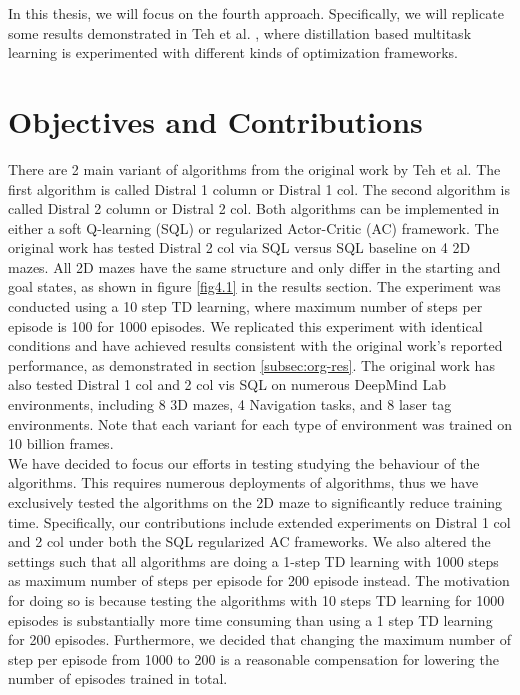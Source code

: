 \documentclass[12pt]{report}
\begin{document}
In this thesis, we will focus on the fourth approach. Specifically, we will replicate some results demonstrated in Teh et al. \cite{teh2017distral}, where distillation based multitask learning is experimented with different kinds of optimization frameworks. 

\section{Objectives and Contributions}
There are 2 main variant of algorithms from the original work by Teh et al. The first algorithm is called Distral 1 column or Distral 1 col. The second algorithm is called Distral 2 column or Distral 2 col. Both algorithms can be implemented in either a soft Q-learning (SQL) or regularized Actor-Critic (AC) framework. The original work has tested Distral 2 col via SQL versus SQL baseline on 4 2D mazes. All 2D mazes have the same structure and only differ in the starting and goal states, as shown in figure \ref{fig4.1} in the results section. The experiment was conducted using a 10 step TD learning, where maximum number of steps per episode is 100 for 1000 episodes. We replicated this experiment with identical conditions and have achieved results consistent with the original work's reported performance, as demonstrated in section \ref{subsec:org-res}. The original work has also tested Distral 1 col and 2 col vis SQL on numerous DeepMind Lab environments, including 8 3D mazes, 4 Navigation tasks, and 8 laser tag environments. Note that each variant for each type of environment was trained on 10 billion frames.\\

We have decided to focus our efforts in testing studying the behaviour of the algorithms. This requires numerous deployments of algorithms, thus we have exclusively tested the algorithms on the 2D maze to significantly reduce training time. Specifically, our contributions include extended experiments on Distral 1 col and 2 col under both the SQL regularized AC frameworks. We also altered the settings such that all algorithms are doing a 1-step TD learning with 1000 steps as maximum number of steps per episode for 200 episode instead. The motivation for doing so is because testing the algorithms with 10 steps TD learning for 1000 episodes is substantially more time consuming than using a 1 step TD learning for 200 episodes. Furthermore, we decided that changing the maximum number of step per episode from 1000 to 200 is a reasonable compensation for lowering the number of episodes trained in total.\\
\end{document}
